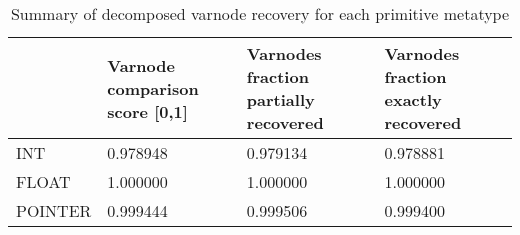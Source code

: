\begin{table}[t]
\centering
\caption{Summary of decomposed varnode recovery for each primitive metatype}
\label{table:metatype-recovery-summary-decomposed}
\begin{tabular}{lp{6.0cm}p{6.0cm}p{6.0cm}}
\toprule
{} &  Varnode comparison score [0,1] &  Varnodes fraction partially recovered &  Varnodes fraction exactly recovered \\
\midrule
INT     &                        0.978948 &                               0.979134 &                             0.978881 \\
FLOAT   &                        1.000000 &                               1.000000 &                             1.000000 \\
POINTER &                        0.999444 &                               0.999506 &                             0.999400 \\
\bottomrule
\end{tabular}
\end{table}
